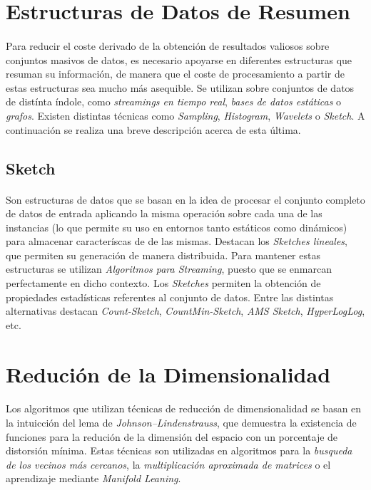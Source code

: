 \documentclass[a4paper]{article}
\begin{document}
  \section{Estructuras de Datos de Resumen}

    \paragraph{}
    Para reducir el coste derivado de la obtención de resultados valiosos sobre conjuntos masivos de datos, es necesario apoyarse en diferentes estructuras que resuman su información, de manera que el coste de procesamiento a partir de estas estructuras sea mucho más asequible. Se utilizan sobre conjuntos de datos de distínta índole, como \emph{streamings en tiempo real}, \emph{bases de datos estáticas} o \emph{grafos}. Existen distintas técnicas como \emph{Sampling}, \emph{Histogram}, \emph{Wavelets} o \emph{Sketch}. A continuación se realiza una breve descripción acerca de esta última.

    \subsection{Sketch}

      \paragraph{}
      Son estructuras de datos que se basan en la idea de procesar el conjunto completo de datos de entrada aplicando la misma operación sobre cada una de las instancias (lo que permite su uso en entornos tanto estáticos como dinámicos) para almacenar caracteríscas de de las mismas. Destacan los \emph{Sketches lineales}, que permiten su generación de manera distribuida. Para mantener estas estructuras se utilizan \emph{Algoritmos para Streaming}, puesto que se enmarcan perfectamente en dicho contexto. Los \emph{Sketches} permiten la obtención de propiedades estadísticas referentes al conjunto de datos. Entre las distintas alternativas destacan \emph{Count-Sketch}, \emph{CountMin-Sketch}, \emph{AMS Sketch}, \emph{HyperLogLog}, etc.

  \section{Redución de la Dimensionalidad}

    \paragraph{}
    Los algoritmos que utilizan técnicas de reducción de dimensionalidad se basan en la intuicción del lema de \emph{Johnson–Lindenstrauss}, que demuestra la existencia de funciones para la redución de la dimensión del espacio con un porcentaje de distorsión mínima. Estas técnicas son utilizadas en algoritmos para la \emph{busqueda de los vecinos más cercanos}, la \emph{multiplicación aproximada de matrices} o el aprendizaje mediante \emph{Manifold Leaning}.
\end{document}
